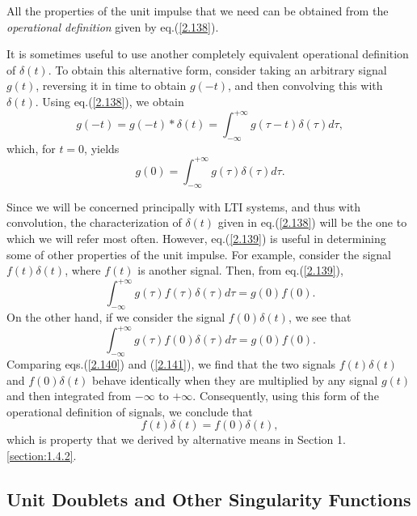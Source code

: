 \documentclass[a4paper,twoside]{book}
\begin{document}
All the properties of the unit impulse that we need can be obtained from the \textit{operational definition} given by eq.\;(\ref{2.138}).

It is sometimes useful to use another completely equivalent operational definition of $\delta(t)$. To obtain this alternative form, consider taking an arbitrary signal $g(t)$, reversing it in time to obtain $g(-t)$, and then convolving this with $\delta(t)$. Using eq.\;(\ref{2.138}), we obtain $$g(-t)= g(-t)*\delta(t)=\int_{-\infty}^{+\infty}g(\tau-t) \delta(\tau) d\tau,$$ which, for $t=0$, yields
\begin{equation}
    g(0)=\int_{-\infty}^{+\infty}g(\tau)\delta(\tau)d\tau.
    \label{2.139}
\end{equation}

Since we will be concerned principally with LTI systems, and thus with convolution, the characterization of $\delta(t)$ given in eq.\;(\ref{2.138}) will be the one to which we will refer most often. However, eq.\;(\ref{2.139}) is useful in determining some of other properties of the unit impulse. For example, consider the signal $f(t)\delta(t)$, where $f(t)$ is another signal. Then, from eq.\;(\ref{2.139}),
\begin{equation}
    \int_{-\infty}^{+\infty}g(\tau)f(\tau)\delta(\tau)d\tau=g(0)f(0).
    \label{2.140}
\end{equation}
On the other hand, if we consider the signal $f(0)\delta(t)$, we see that
\begin{equation}
    \int_{-\infty}^{+\infty}g(\tau)f(0) \delta(\tau) d\tau= g(0)f(0).
    \label{2.141}
\end{equation}
Comparing eqs.\;(\ref{2.140}) and (\ref{2.141}), we find that the two signals $f(t)\delta(t)$ and $f(0)\delta(t)$ behave identically when they are multiplied by any signal $g(t)$ and then integrated from $-\infty$ to $+\infty$. Consequently, using this form of the operational definition of signals, we conclude that
\begin{equation}
    f(t)\delta(t)=f(0)\delta(t),
    \label{2.142}
\end{equation}
which is property that we derived by alternative means in Section 1.\ref{section:1.4.2}.

\subsection{Unit Doublets and Other Singularity Functions}
\end{document}
